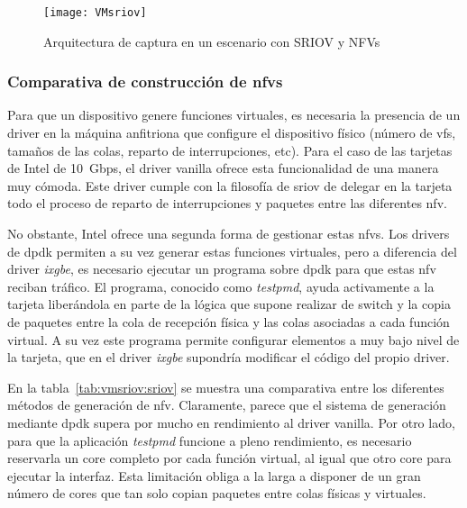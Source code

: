 \begin{figure}[!htb]
\centering
\texttt{[image: VMsriov]}
\caption{Arquitectura de captura en un escenario con SRIOV y NFVs}
\label{fig:vmsriov} 
\end{figure}

\subsubsection{Comparativa de construcción de \glspl{nfv}}

Para que un dispositivo genere funciones virtuales, es necesaria la presencia de un driver en la máquina anfitriona que configure el dispositivo físico (número de \glspl{vf}, tamaños de las colas, reparto de interrupciones, etc). Para el caso de las tarjetas de Intel de 10~Gbps, el driver \gls{vanilla} ofrece esta funcionalidad de una manera muy cómoda. Este driver cumple con la filosofía de \gls{sriov} de delegar en la tarjeta todo el proceso de reparto de interrupciones y paquetes entre las diferentes \gls{nfv}.

No obstante, Intel ofrece una segunda forma de gestionar estas \glspl{nfv}. Los drivers de \gls{dpdk} permiten a su vez generar estas funciones virtuales, pero a diferencia del driver \textit{ixgbe}, es necesario ejecutar un programa sobre \gls{dpdk} para que estas \gls{nfv} reciban tráfico. El programa, conocido como \textit{testpmd}, ayuda activamente a la tarjeta liberándola en parte de la lógica que supone realizar de switch y la copia de paquetes entre la cola de recepción física y las colas asociadas a cada función virtual.
A su vez este programa permite configurar elementos a muy bajo nivel de la tarjeta, que en el driver \textit{ixgbe} supondría modificar el código del propio driver.

En la tabla~\ref{tab:vmsriov:sriov} se muestra una comparativa entre los diferentes métodos de generación de \gls{nfv}. Claramente, parece que el sistema de generación mediante \gls{dpdk} supera por mucho en rendimiento al driver \gls{vanilla}. Por otro lado, para que la aplicación \textit{testpmd} funcione a pleno rendimiento, es necesario reservarla un \gls{core} completo por cada función virtual, al igual que otro \gls{core} para ejecutar la interfaz. Esta limitación obliga a la larga a disponer de un gran número de cores que tan solo copian paquetes entre colas físicas y virtuales.

